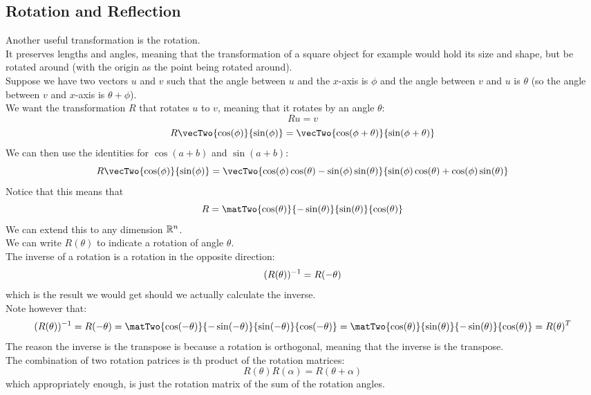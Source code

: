 \documentclass[12pt]{article}
\begin{document}
\newpage

\subsection*{Rotation and Reflection}

Another useful transformation is the rotation. \\
It preserves lengths and angles,
meaning that the transformation of a square object
for example would hold its size and shape, but be rotated
around (with the origin as the point being rotated around). \\

Suppose we have two vectors $u$ and $v$
such that the angle between $u$ and the $x$-axis
is $\phi$ and the angle between $v$ and $u$
is $\theta$ (so the angle between $v$
and $x$-axis is $\theta + \phi$). \\
We want the transformation $R$
that rotates $u$ to $v$,
meaning that it rotates by an angle $\theta$:
\[ Ru = v \]
\[ R\vecTwo{\cos(\phi)}{\sin(\phi)}
= \vecTwo{\cos(\phi + \theta)}{\sin(\phi + \theta)} \]
We can then use the identities for
$\cos(a + b)$ and $\sin(a+b)$:
\[ R\vecTwo{\cos(\phi)}{\sin(\phi)}
= \vecTwo{\cos(\phi)\cos(\theta) - \sin(\phi)\sin(\theta)}
{\sin(\phi)\cos(\theta) + \cos(\phi)\sin(\theta)} \]
Notice that this means that
\[R = \matTwo{\cos(\theta)}{-\sin(\theta)}
{\sin(\theta)}{\cos(\theta)} \]
We can extend this to any dimension $\mathbb{R}^n$. \\
We can write $R(\theta)$ to indicate
a rotation of angle $\theta$. \\

The inverse of a rotation is a rotation
in the opposite direction:
\[ (R(\theta))^{-1} = R(-\theta) \]
which is the result we would get should we
actually calculate the inverse. \\
Note however that:
\[ (R(\theta))\inv = R(-\theta) 
= \matTwo{\cos(-\theta)}{-\sin(-\theta)}
{\sin(-\theta)}{\cos(-\theta)}
= \matTwo{\cos(\theta)}{\sin(\theta)}
{-\sin(\theta)}{\cos(\theta)} = R(\theta)^T \]
The reason the inverse is the transpose 
is because a rotation is orthogonal,
meaning that the inverse is the transpose. \\

The combination of two rotation patrices
is th product of the rotation matrices:
\[ R(\theta)R(\alpha) = R(\theta + \alpha) \]
which appropriately enough, is just the rotation
matrix of the sum of the rotation angles. \\
\end{document}
